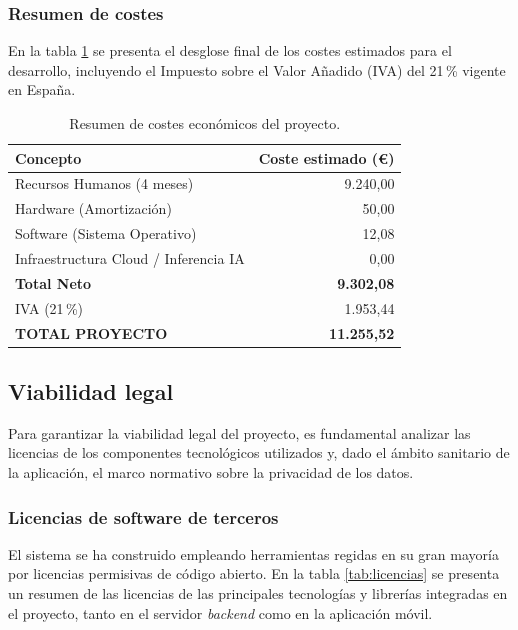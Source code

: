 \subsubsection*{Resumen de costes}
En la tabla \ref{tab:costes} se presenta el desglose final de los costes estimados para el desarrollo, incluyendo el Impuesto sobre el Valor Añadido (IVA) del 21\,\% vigente en España.

\begin{table}[h]
\centering
\begin{tabular}{lr}
\hline
\textbf{Concepto} & \textbf{Coste estimado (\euro)} \\ \hline
Recursos Humanos (4 meses) & 9.240,00 \\
Hardware (Amortización) & 50,00 \\
Software (Sistema Operativo) & 12,08 \\
Infraestructura Cloud / Inferencia IA & 0,00 \\ \hline
\textbf{Total Neto} & \textbf{9.302,08} \\
IVA (21\,\%) & 1.953,44 \\ \hline
\textbf{TOTAL PROYECTO} & \textbf{11.255,52} \\ \hline
\end{tabular}
\caption{Resumen de costes económicos del proyecto.}
\label{tab:costes}
\end{table}

\subsection{Viabilidad legal}
Para garantizar la viabilidad legal del proyecto, es fundamental analizar las licencias de los componentes tecnológicos utilizados y, dado el ámbito sanitario de la aplicación, el marco normativo sobre la privacidad de los datos.

\subsubsection*{Licencias de software de terceros}
El sistema se ha construido empleando herramientas regidas en su gran mayoría por licencias permisivas de código abierto. En la tabla \ref{tab:licencias} se presenta un resumen de las licencias de las principales tecnologías y librerías integradas en el proyecto, tanto en el servidor \textit{backend} como en la aplicación móvil.

